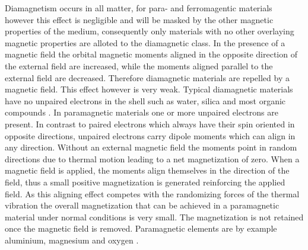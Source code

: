 Diamagnetism occurs in all matter, for para- and ferromagentic materials however this effect is negligible and will be masked by the other magnetic properties of the medium, consequently only materials with no other overlaying magnetic properties are alloted to the diamagnetic class. In the presence of a magnetic field the orbital magnetic moments aligned in the opposite direction of the external field are increased, while the moments aligned parallel to the external field are decreased. Therefore diamagnetic materials are repelled by a magnetic field. This effect however is very weak. Typical diamagnetic materials have no unpaired electrons in the shell such as water, silica and most organic compounds \cite{svoboda2004magnetic}\cite{griffiths2011elektrodynamik}.\newline
In paramagnetic materials one or more unpaired electrons are present. In contrast to paired electrons which always have their spin oriented in opposite directions, unpaired electrons carry dipole moments which can align in any direction. Without an external magnetic field the moments point in random directions due to thermal motion leading to a net magnetization of zero. When a magnetic field is applied, the moments align themselves in the direction of the field, thus a small positive magnetization is generated reinforcing the applied field. As this aligning effect competes with the randomizing forces of the thermal vibration the overall magnetization that can be achieved in a paramagnetic material under normal conditions is very small. The magnetization is not retained once the magnetic field is removed. Paramagnetic elements are by example aluminium, magnesium and oxygen \cite{svoboda2004magnetic}\cite{griffiths2011elektrodynamik}.\newline  %

